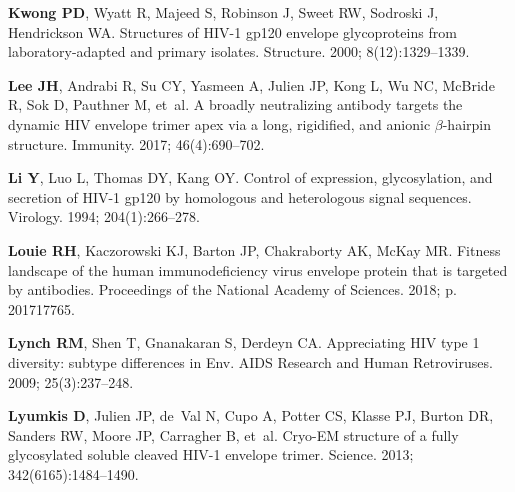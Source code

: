 \documentclass[9pt]{elife}
\begin{document}
\begin{thebibliography}{114}
\textbf{\color{eLifeMediumGrey} Kwong PD}, Wyatt R, Majeed S, Robinson J, Sweet
  RW, Sodroski J, Hendrickson WA.
\newblock Structures of HIV-1 gp120 envelope glycoproteins from
  laboratory-adapted and primary isolates.
\newblock Structure.  2000; 8(12):1329--1339.

\textbf{\color{eLifeMediumGrey} Lee JH}, Andrabi R, Su CY, Yasmeen A, Julien
  JP, Kong L, Wu NC, McBride R, Sok D, Pauthner M, et~al.
\newblock A broadly neutralizing antibody targets the dynamic HIV envelope
  trimer apex via a long, rigidified, and anionic $\beta$-hairpin structure.
\newblock Immunity.  2017; 46(4):690--702.

\textbf{\color{eLifeMediumGrey} Li Y}, Luo L, Thomas DY, Kang OY.
\newblock Control of expression, glycosylation, and secretion of HIV-1 gp120 by
  homologous and heterologous signal sequences.
\newblock Virology.  1994; 204(1):266--278.

\textbf{\color{eLifeMediumGrey} Louie RH}, Kaczorowski KJ, Barton JP,
  Chakraborty AK, McKay MR.
\newblock Fitness landscape of the human immunodeficiency virus envelope
  protein that is targeted by antibodies.
\newblock Proceedings of the National Academy of Sciences.  2018; p. 201717765.

\textbf{\color{eLifeMediumGrey} Lynch RM}, Shen T, Gnanakaran S, Derdeyn CA.
\newblock Appreciating {HIV} type 1 diversity: subtype differences in {Env}.
\newblock AIDS Research and Human Retroviruses.  2009; 25(3):237--248.

\textbf{\color{eLifeMediumGrey} Lyumkis D}, Julien JP, de~Val N, Cupo A, Potter
  CS, Klasse PJ, Burton DR, Sanders RW, Moore JP, Carragher B, et~al.
\newblock Cryo-EM structure of a fully glycosylated soluble cleaved HIV-1
  envelope trimer.
\newblock Science.  2013; 342(6165):1484--1490.


\end{thebibliography}
\end{document}
